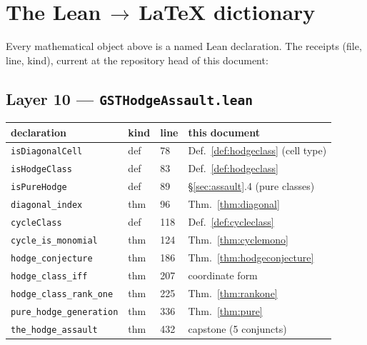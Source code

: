 \documentclass[11pt,a4paper]{article}
\theoremstyle{plain}
\theoremstyle{definition}
\begin{document}
\appendix
\section{The Lean\,\texorpdfstring{$\to$}{->}\,LaTeX dictionary}
\label{app:dictionary}

Every mathematical object above is a named Lean declaration. The receipts
(file, line, kind), current at the repository head of this document:

\subsection{Layer 10 --- \texttt{GSTHodgeAssault.lean}}
\begingroup\small
\begin{longtable}{@{}p{4.6cm}p{1.0cm}p{1.1cm}p{7.0cm}@{}}
\toprule
declaration & kind & line & this document \\
\midrule
\texttt{isDiagonalCell} & def & 78 & Def.~\ref{def:hodgeclass} (cell type) \\
\texttt{isHodgeClass} & def & 83 & Def.~\ref{def:hodgeclass} \\
\texttt{isPureHodge} & def & 89 & \S\ref{sec:assault}.4 (pure classes) \\
\texttt{diagonal\_index} & thm & 96 & Thm.~\ref{thm:diagonal} \\
\texttt{cycleClass} & def & 118 & Def.~\ref{def:cycleclass} \\
\texttt{cycle\_is\_monomial} & thm & 124 & Thm.~\ref{thm:cyclemono} \\
\texttt{hodge\_conjecture} & thm & 186 & Thm.~\ref{thm:hodgeconjecture} \\
\texttt{hodge\_class\_iff} & thm & 207 & coordinate form \\
\texttt{hodge\_class\_rank\_one} & thm & 225 & Thm.~\ref{thm:rankone} \\
\texttt{pure\_hodge\_generation} & thm & 336 & Thm.~\ref{thm:pure} \\
\texttt{the\_hodge\_assault} & thm & 432 & capstone (5 conjuncts) \\
\bottomrule
\end{longtable}
\endgroup
\end{document}
